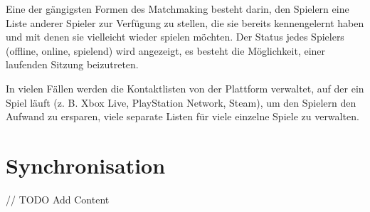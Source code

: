 Eine der gängigsten Formen des Matchmaking besteht darin, den Spielern eine Liste anderer Spieler zur Verfügung zu stellen, die sie bereits kennengelernt haben und mit denen sie vielleicht wieder spielen möchten. Der Status jedes Spielers (offline, online, spielend) wird angezeigt, es besteht die Möglichkeit, einer laufenden Sitzung beizutreten.

In vielen Fällen werden die Kontaktlisten von der Plattform verwaltet, auf der ein Spiel läuft (z. B. Xbox Live, PlayStation Network, Steam), um den Spielern den Aufwand zu ersparen, viele separate Listen für viele einzelne Spiele zu verwalten. 

\cite{Wikipedia.2021b}

\section{Synchronisation}

// TODO Add Content